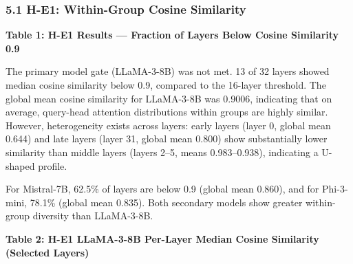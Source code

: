 
\subsubsection{5.1 H-E1: Within-Group Cosine Similarity}

\textbf{Table 1: H-E1 Results --- Fraction of Layers Below Cosine Similarity 0.9}

\begin{table}[htbp]
\centering
{}
\end{table}

The primary model gate (LLaMA-3-8B) was not met. 13 of 32 layers showed median cosine similarity below 0.9, compared to the 16-layer threshold. The global mean cosine similarity for LLaMA-3-8B was 0.9006, indicating that on average, query-head attention distributions within groups are highly similar. However, heterogeneity exists across layers: early layers (layer 0, global mean 0.644) and late layers (layer 31, global mean 0.800) show substantially lower similarity than middle layers (layers 2--5, means 0.983--0.938), indicating a U-shaped profile.

For Mistral-7B, 62.5\% of layers are below 0.9 (global mean 0.860), and for Phi-3-mini, 78.1\% (global mean 0.835). Both secondary models show greater within-group diversity than LLaMA-3-8B.

\textbf{Table 2: H-E1 LLaMA-3-8B Per-Layer Median Cosine Similarity (Selected Layers)}

\begin{table}[htbp]
\centering
{}
\end{table}


